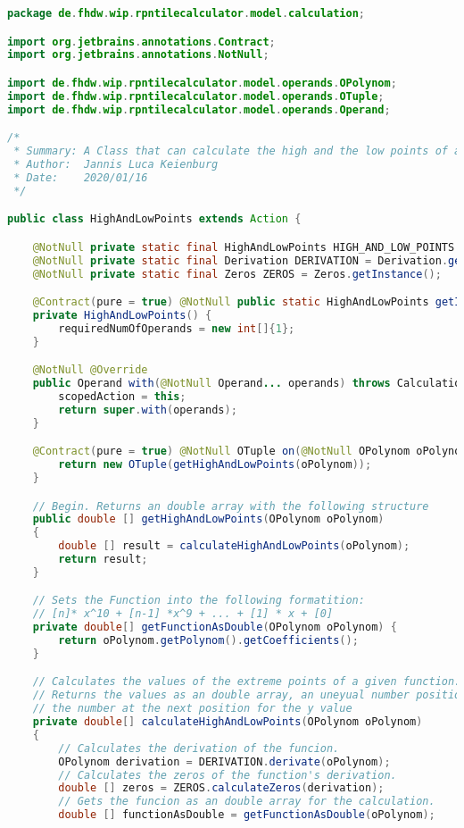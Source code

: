 \begin{lstlisting}[caption=HighAndLowPoints (Keienburg),label=list:HighAndLowPoints,language=Java]
package de.fhdw.wip.rpntilecalculator.model.calculation;

import org.jetbrains.annotations.Contract;
import org.jetbrains.annotations.NotNull;

import de.fhdw.wip.rpntilecalculator.model.operands.OPolynom;
import de.fhdw.wip.rpntilecalculator.model.operands.OTuple;
import de.fhdw.wip.rpntilecalculator.model.operands.Operand;

/*
 * Summary: A Class that can calculate the high and the low points of a function( up to third grade)
 * Author:  Jannis Luca Keienburg
 * Date:    2020/01/16
 */

public class HighAndLowPoints extends Action {

    @NotNull private static final HighAndLowPoints HIGH_AND_LOW_POINTS = new HighAndLowPoints();
    @NotNull private static final Derivation DERIVATION = Derivation.getInstance();
    @NotNull private static final Zeros ZEROS = Zeros.getInstance();

    @Contract(pure = true) @NotNull public static HighAndLowPoints getInstance() { return HIGH_AND_LOW_POINTS; }
    private HighAndLowPoints() {
        requiredNumOfOperands = new int[]{1};
    }

    @NotNull @Override
    public Operand with(@NotNull Operand... operands) throws CalculationException {
        scopedAction = this;
        return super.with(operands);
    }

    @Contract(pure = true) @NotNull OTuple on(@NotNull OPolynom oPolynom) {
        return new OTuple(getHighAndLowPoints(oPolynom));
    }

    // Begin. Returns an double array with the following structure
    public double [] getHighAndLowPoints(OPolynom oPolynom)
    {
        double [] result = calculateHighAndLowPoints(oPolynom);
        return result;
    }

    // Sets the Function into the following formatition:
    // [n]* x^10 + [n-1] *x^9 + ... + [1] * x + [0]
    private double[] getFunctionAsDouble(OPolynom oPolynom) {
        return oPolynom.getPolynom().getCoefficients();
    }

    // Calculates the values of the extreme points of a given function.
    // Returns the values as an double array, an uneyual number position stands for the x value,
    // the number at the next position for the y value
    private double[] calculateHighAndLowPoints(OPolynom oPolynom)
    {
        // Calculates the derivation of the funcion.
        OPolynom derivation = DERIVATION.derivate(oPolynom);
        // Calculates the zeros of the function's derivation.
        double [] zeros = ZEROS.calculateZeros(derivation);
        // Gets the funcion as an double array for the calculation.
        double [] functionAsDouble = getFunctionAsDouble(oPolynom);


\end{lstlisting}
